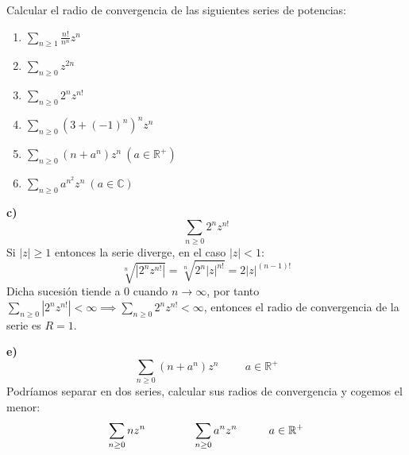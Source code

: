 \begin{ejer}
	Calcular el radio de convergencia de las siguientes series de potencias:
	\begin{enumerate}[label=(\alph*)]
		\item $\sum_{n\geq1} \frac{n!}{n^n}z^n$
		\item $\sum_{n\geq 0} z^{2n}$
		\item $\sum_{n\geq 0} 2^nz^{n!}$
		\item $\sum_{n\geq 0} (3+(-1)^n)^nz^n$
		\item $\sum_{n\geq 0} (n+a^n)z^n \ (a\in\mathbb{R}^+)$
		\item $\sum_{n\geq 0} a^{n^2}z^n \ (a\in\mathbb{C})$
	\end{enumerate}
\end{ejer}

\begin{comment}


\textbf{b)} %

$\sum_{n\geq 0} z^{2n} = \sum_{n\geq 0} \alpha_nz^n$
con $\alpha_nz{2n+1} =0, \alpha_{2n} = 1$

Vemos el límite superior de la sucesión
$\limsup |\alpha_n| = 1 \implies R=\frac{1}{1} = 1$
\end{comment}



\textbf{c)}
$$\sum_{n\geq 0} 2^nz^{n!}$$
Si $|z|\geq 1$ entonces la serie diverge, en el caso $|z|<1$:
$$\sqrt[n]{|2^nz^{n!}|} = \sqrt[n]{2^n|z|^{n!}} = 2|z|^{(n-1)!}$$
Dicha sucesión tiende a $0$ cuando $n\rightarrow\infty$, por tanto %
$\sum_{n\geq 0} |2^nz^{n!}| < \infty \implies \sum_{n\geq 0} 2^nz^{n!} < \infty$, entonces el radio de convergencia de la serie es $R=1$.



\textbf{e)}
$$\sum_{n\geq 0} (n+a^n)z^n \hspace{1cm} a\in\mathbb{R}^+$$
Podríamos separar en dos series, calcular sus radios de convergencia y cogemos el menor:
$$\sum_{n\geq 0} nz^n \hspace{1.5cm}\sum_{n\geq 0} a^nz^n\hspace{1cm} a\in\mathbb{R}^+$$
\begin{comment}
Observamos que $a^n \leq n+a^n \leq (n+1)a^n$,
en los extremos el radio de convergencia es $1/a$, por tanto el radio de convergencia de $n+a^n$ es $1/a$
$$\sum_{n\geq 0} a^n |z|^n \leq \sum_{n\geq 0} (n+a^n)|z|^n \leq \sum_{n\geq 0} (n+1)a^n|z|^n$$
Por tanto el radio de convergencia es $1/a$.
\end{comment}

